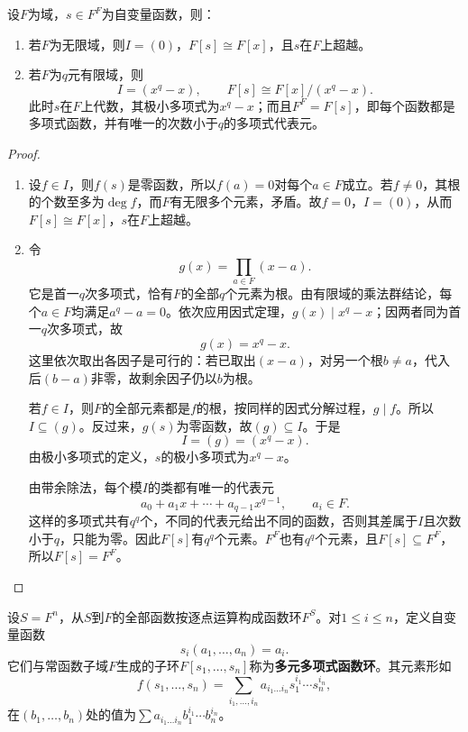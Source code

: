 \begin{theorem}\label{p2:poly-functions-one}
设$F$为域，$s\in F^F$为自变量函数，则：
\begin{enumerate}
\item 若$F$为无限域，则$I=(0)$，$F[s]\cong F[x]$，且$s$在$F$上超越。
\item 若$F$为$q$元有限域，则
\[
I=(x^q-x),\qquad F[s]\cong F[x]/(x^q-x).
\]
此时$s$在$F$上代数，其极小多项式为$x^q-x$；而且$F^F=F[s]$，即每个函数都是多项式函数，并有唯一的次数小于$q$的多项式代表元。
\end{enumerate}
\end{theorem}
\begin{proof}
\begin{enumerate}
\item 设$f\in I$，则$f(s)$是零函数，所以$f(a)=0$对每个$a\in F$成立。若$f\ne0$，其根的个数至多为$\deg f$，而$F$有无限多个元素，矛盾。故$f=0$，$I=(0)$，从而$F[s]\cong F[x]$，$s$在$F$上超越。

\item 令
\[
g(x)=\prod_{a\in F}(x-a).
\]
它是首一$q$次多项式，恰有$F$的全部$q$个元素为根。由有限域的乘法群结论，每个$a\in F$均满足$a^q-a=0$。依次应用因式定理，$g(x)\mid x^q-x$；因两者同为首一$q$次多项式，故
\[
g(x)=x^q-x.
\]
这里依次取出各因子是可行的：若已取出$(x-a)$，对另一个根$b\ne a$，代入后$(b-a)$非零，故剩余因子仍以$b$为根。

若$f\in I$，则$F$的全部元素都是$f$的根，按同样的因式分解过程，$g\mid f$。所以$I\subseteq(g)$。反过来，$g(s)$为零函数，故$(g)\subseteq I$。于是
\[
I=(g)=(x^q-x).
\]
由极小多项式的定义，$s$的极小多项式为$x^q-x$。

由带余除法，每个模$I$的类都有唯一的代表元
\[
a_0+a_1x+\cdots+a_{q-1}x^{q-1},\qquad a_i\in F.
\]
这样的多项式共有$q^q$个，不同的代表元给出不同的函数，否则其差属于$I$且次数小于$q$，只能为零。因此$F[s]$有$q^q$个元素。$F^F$也有$q^q$个元素，且$F[s]\subseteq F^F$，所以$F[s]=F^F$。
\end{enumerate}
\end{proof}

\begin{definition}
设$S=F^n$，从$S$到$F$的全部函数按逐点运算构成函数环$F^S$。对$1\le i\le n$，定义自变量函数
\[
s_i(a_1,\ldots,a_n)=a_i.
\]
它们与常函数子域$F$生成的子环$F[s_1,\ldots,s_n]$称为\textbf{多元多项式函数环}。其元素形如
\[
f(s_1,\ldots,s_n)=\sum_{i_1,\ldots,i_n}a_{i_1\ldots i_n}s_1^{i_1}\cdots s_n^{i_n},
\]
在$(b_1,\ldots,b_n)$处的值为$\sum a_{i_1\ldots i_n}b_1^{i_1}\cdots b_n^{i_n}$。
\end{definition}

